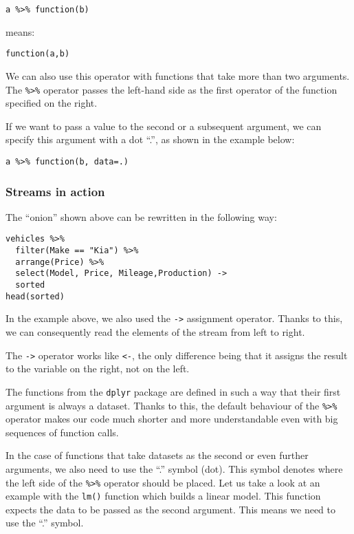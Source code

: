 \documentclass[]{book}
\theoremstyle{definition}
\theoremstyle{definition}
\theoremstyle{definition}
\theoremstyle{remark}
\begin{document}
\begin{verbatim}
a %>% function(b)
\end{verbatim}

means:

\begin{verbatim}
function(a,b)
\end{verbatim}

We can also use this operator with functions that take more than two
arguments. The \texttt{\%\textgreater{}\%} operator passes the left-hand
side as the first operator of the function specified on the right.

If we want to pass a value to the second or a subsequent argument, we
can specify this argument with a dot ``.'', as shown in the example
below:

\begin{verbatim}
a %>% function(b, data=.)
\end{verbatim}

\subsubsection*{Streams in action}\label{streams-in-action}

The ``onion'' shown above can be rewritten in the following way:

\begin{verbatim}
vehicles %>%
  filter(Make == "Kia") %>%
  arrange(Price) %>%
  select(Model, Price, Mileage,Production) ->
  sorted
head(sorted)
\end{verbatim}

In the example above, we also used the \texttt{-\textgreater{}}
assignment operator. Thanks to this, we can consequently read the
elements of the stream from left to right.

The \texttt{-\textgreater{}} operator works like \texttt{\textless{}-},
the only difference being that it assigns the result to the variable on
the right, not on the left.

The functions from the \texttt{dplyr} package are defined in such a way
that their first argument is always a dataset. Thanks to this, the
default behaviour of the \texttt{\%\textgreater{}\%} operator makes our
code much shorter and more understandable even with big sequences of
function calls.

In the case of functions that take datasets as the second or even
further arguments, we also need to use the ``.'' symbol (dot). This
symbol denotes where the left side of the \texttt{\%\textgreater{}\%}
operator should be placed. Let us take a look at an example with the
\texttt{lm()} function which builds a linear model. This function
expects the data to be passed as the second argument. This means we need
to use the ``.'' symbol.
\end{document}
